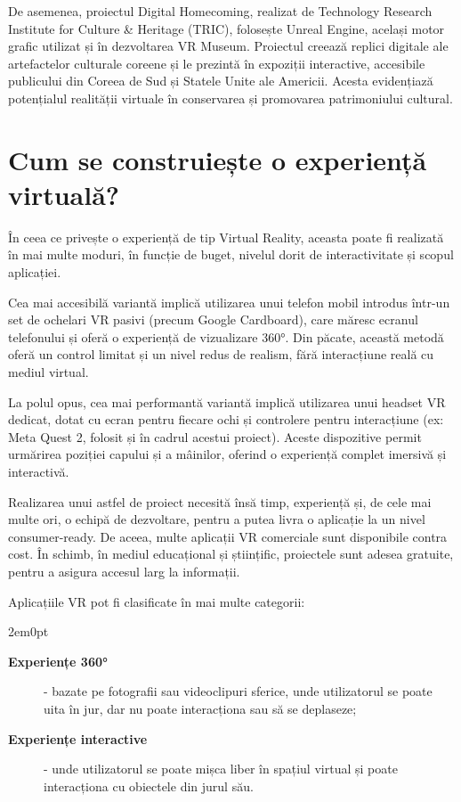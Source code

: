 De asemenea, proiectul Digital Homecoming, realizat de Technology Research Institute for Culture \& Heritage (TRIC), folosește Unreal Engine, același motor grafic utilizat și în dezvoltarea VR Museum. Proiectul creează replici digitale ale artefactelor culturale coreene și le prezintă în expoziții interactive, accesibile publicului din Coreea de Sud și Statele Unite ale Americii. Acesta evidențiază potențialul realității virtuale în conservarea și promovarea patrimoniului cultural.

\section{Cum se construiește o experiență virtuală?}

În ceea ce privește o experiență de tip Virtual Reality, aceasta poate fi realizată în mai multe moduri, în funcție de buget, nivelul dorit de interactivitate și scopul aplicației.

Cea mai accesibilă variantă implică utilizarea unui telefon mobil introdus într-un set de ochelari VR pasivi (precum Google Cardboard), care măresc ecranul telefonului și oferă o experiență de vizualizare 360°. Din păcate, această metodă oferă un control limitat și un nivel redus de realism, fără interacțiune reală cu mediul virtual.

La polul opus, cea mai performantă variantă implică utilizarea unui headset VR dedicat, dotat cu ecran pentru fiecare ochi și controlere pentru interacțiune (ex: Meta Quest 2, folosit și în cadrul acestui proiect). Aceste dispozitive permit urmărirea poziției capului și a mâinilor, oferind o experiență complet imersivă și interactivă.

Realizarea unui astfel de proiect necesită însă timp, experiență și, de cele mai multe ori, o echipă de dezvoltare, pentru a putea livra o aplicație la un nivel consumer-ready. De aceea, multe aplicații VR comerciale sunt disponibile contra cost. În schimb, în mediul educațional și științific, proiectele sunt adesea gratuite, pentru a asigura accesul larg la informații.

Aplicațiile VR pot fi clasificate în mai multe categorii:

\begin{adjustwidth}{2em}{0pt}
\begin{description}
    \item[\textbf{Experiențe 360°}] - bazate pe fotografii sau videoclipuri sferice, unde utilizatorul se poate uita în jur, dar nu poate interacționa sau să se deplaseze;    
    \item[\textbf{Experiențe interactive}] - unde utilizatorul se poate mișca liber în spațiul virtual și poate interacționa cu obiectele din jurul său.
\end{description}
\end{adjustwidth}

